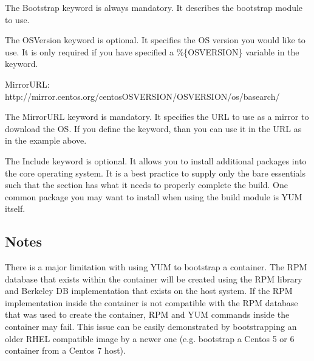 \documentclass[letterpaper,10pt,english]{sphinxmanual}
\begin{document}
The Bootstrap keyword is always mandatory. It describes the bootstrap module to use.

%
\begin{sphinxVerbatim}[commandchars=\\\{\}]
 
\end{sphinxVerbatim}

The OSVersion keyword is optional. It specifies the OS version you would like to use. It is only required if you have specified a \%\{OSVERSION\}
variable in the  keyword.

%
\begin{sphinxVerbatim}[commandchars=\\\{\}]
MirrorURL: http://mirror.centos.org/centos\PYGZhy{}\PYGZpc{}\PYGZob{}OSVERSION\PYGZcb{}/\PYGZpc{}\PYGZob{}OSVERSION\PYGZcb{}/os/\PYGZdl{}basearch/
\end{sphinxVerbatim}

The MirrorURL keyword is mandatory. It specifies the URL to use as a mirror to download the OS. If you define the  keyword, than you
can use it in the URL as in the example above.

%
\begin{sphinxVerbatim}[commandchars=\\\{\}]
 
\end{sphinxVerbatim}

The Include keyword is optional. It allows you to install additional packages into the core operating system. It is a best practice to supply
only the bare essentials such that the  section has what it needs to properly complete the build. One common package you may want to install
when using the  build module is YUM itself.


\subsection{Notes}
\label{\detokenize{appendix:id10}}
There is a major limitation with using YUM to bootstrap a container. The RPM database that exists within the container will be created using the
RPM library and Berkeley DB implementation that exists on the host system. If the RPM implementation inside the container is not compatible with
the RPM database that was used to create the container, RPM and YUM commands inside the container may fail. This issue can be easily demonstrated
by bootstrapping an older RHEL compatible image by a newer one (e.g. bootstrap a Centos 5 or 6 container from a Centos 7 host).
\end{document}
